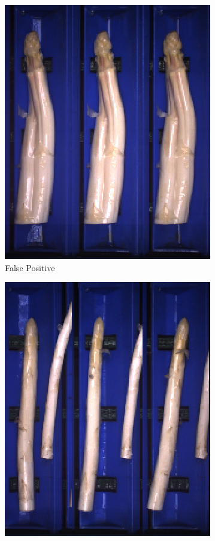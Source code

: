 \begin{figure}[h]
	\begin{subfigure}{0.3\textwidth}
		\includegraphics[width=0.9\linewidth]{Figures/appendix/notclassifiable_falsepositive_01.png}
		\vspace{-5pt} 
		\caption{False Positive}
	\end{subfigure}
	\begin{subfigure}{0.3\textwidth}
		\includegraphics[width=0.9\linewidth]{Figures/appendix/notclassifiable_falsepositive_02.png}

\end{subfigure}
\end{figure}
